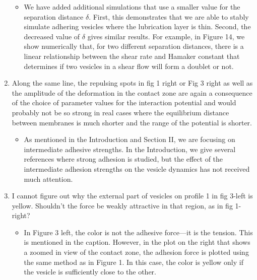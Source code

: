 \documentclass[11pt]{article}
\newcommand{\comment}[1]{{\color{blue} #1}}
\begin{document}
\begin{enumerate}
\begin{itemize}
  \item We have added additional simulations that use a smaller value
    for the separation distance $\delta$.  First, this demonstrates that
    we are able to stably simulate adhering vesicles where the
    lubrication layer is thin.  Second, the decreased value of $\delta$
    gives similar results.  For example, in Figure 14, we show
    numerically that, for two different separation distances, there is a
    linear relationship between the shear rate and Hamaker constant that
    determines if two vesicles in a shear flow will form a doublet or
    not.
\end{itemize}

\item\comment{Along the same line, the repulsing spots in fig 1 right or Fig 3
right as well as the amplitude of the deformation in the contact zone
are again a consequence of the choice of parameter values for the
interaction potential and would probably not be so strong in real
cases where the equilibrium distance between membranes is much shorter
and the range of the potential is shorter.}
\begin{itemize}
  \item As mentioned in the Introduction and Section II, we are focusing
    on intermediate adhesive strengths.  In the Introduction, we give
    several references where strong adhesion is studied, but the effect
    of the intermediate adhesion strengths on the vesicle dynamics has
    not received much attention.
\end{itemize}

\item\comment{I cannot figure out why the external part of vesicles on profile 1
in fig 3-left is yellow. Shouldn't the force be weakly attractive in
that region, as in fig 1-right?}
\begin{itemize}
  \item In Figure 3 left, the color is not the adhesive force---it is the
    tension.  This is mentioned in the caption.  However, in the plot on
    the right that shows a zoomed in view of the contact zone, the
    adhesion force is plotted using the same method as in Figure 1.  In
    this case, the color is yellow only if the vesicle is sufficiently
    close to the other.
\end{itemize}


\end{enumerate}
\end{document}
